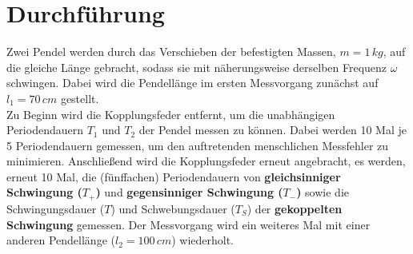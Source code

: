 \section{Durchführung}
Zwei Pendel werden durch das Verschieben der befestigten Massen, $m=1\,\si{kg}$, auf die gleiche Länge gebracht, sodass sie mit näherungsweise derselben Frequenz $ω$ schwingen.
Dabei wird die Pendellänge im ersten Messvorgang zunächst auf $l_1=70\,\si{cm}$ gestellt. \\

Zu Beginn wird die Kopplungsfeder entfernt, um die unabhängigen Periodendauern $T_1$ und $T_2$ der Pendel messen zu können. Dabei werden 10 Mal je 5 Periodendauern gemessen, um den
auftretenden menschlichen Messfehler zu minimieren.
Anschließend wird die Kopplungsfeder erneut angebracht, es werden, erneut 10 Mal, die (fünffachen) Periodendauern von \textbf{gleichsinniger Schwingung ($T_+$)} und \textbf{gegensinniger Schwingung ($T_-$)} 
sowie die Schwingungsdauer ($T$) und Schwebungsdauer ($T_S$) der \textbf{gekoppelten Schwingung} gemessen.
Der Messvorgang wird ein weiteres Mal mit einer anderen Pendellänge ($l_2=100\,\si{cm}$) wiederholt.
\label{sec:Durchführung}
